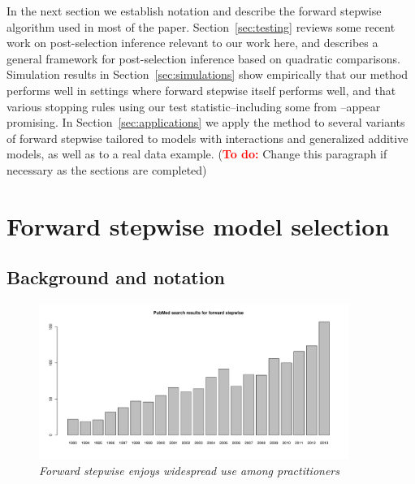 \documentclass{imsart}
\newcommand{\todo}{\textcolor{red}{\textbf{To do: }}}
\begin{document}
In the next section we establish notation and describe the
forward stepwise algorithm used in most of the paper.
Section~\ref{sec:testing} reviews some recent work on
post-selection inference
\citep{significance:LASSO,tests:adaptive,LASSO:fixed}
relevant to our work here, and describes a general framework
for post-selection inference based on quadratic comparisons.
Simulation results in Section~\ref{sec:simulations} show
empirically that our method performs well in settings where forward
stepwise itself performs well, and that
various stopping rules using our test statistic--including
some from \cite{sequential:fdr}--appear promising. In
Section~\ref{sec:applications} we apply
the method to several variants of forward
stepwise tailored to models with interactions and generalized additive
models, as well as to a real data example.
(\todo Change this paragraph if necessary as the sections are completed)

\section{Forward stepwise model selection}
\label{sec:stepwise}

\subsection{Background and notation}

\begin{figure}
\begin{center}
\includegraphics[width=0.9\textwidth]{../figs/pubmed.pdf}
\caption{\small \it Forward stepwise enjoys widespread use among
practitioners}
\label{fig:pubmed}
\end{center}
\end{figure}
\end{document}
